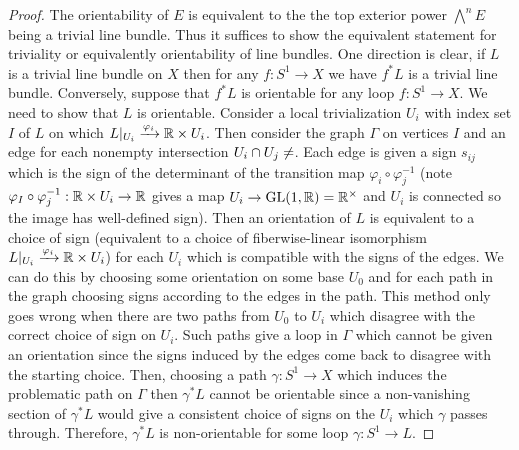 \documentclass[12pt]{extarticle}
\begin{document}
\begin{proof}
The orientability of $E$ is equivalent to the the top exterior power $\bigwedge^n E$ being a trivial line bundle. Thus it suffices to show the equivalent statement for triviality or equivalently orientability of line bundles. One direction is clear, if $L$ is a trivial line bundle on $X$ then for any $f : S^1 \to X$ we have $f^* L$ is a trivial line bundle. Conversely, suppose that $f^* L$ is orientable for any loop $f : S^1 \to X$. We need to show that $L$ is orientable. Consider a local trivialization $U_i$ with index set $I$ of $L$ on which $L |_{U_i} \xrightarrow{\varphi_i} \mathbb{R} \times U_i$. Then consider the graph $\Gamma$ on vertices $I$ and an edge for each nonempty intersection $U_i \cap U_j \neq \empty$. Each edge is given a sign $s_{ij}$ which is the sign of the determinant of the transition map $\varphi_i \circ \varphi_j^{-1}$ (note $\varphi_I \circ \varphi_j^{-1} : \mathbb{R} \times U_i \to \mathbb{R}$ gives a map $U_i \to \mathrm{GL}(1, \mathbb{R}) = \mathbb{R}^\times$ and $U_i$ is connected so the image has well-defined sign). Then an orientation of $L$ is equivalent to a choice of sign (equivalent to a choice of fiberwise-linear isomorphism $L|_{U_i} \xrightarrow{\varphi_i} \mathbb{R} \times U_i$) for each $U_i$ which is compatible with the signs of the edges. We can do this by choosing some orientation on some base $U_0$ and for each path in the graph choosing signs according to the edges in the path. This method only goes wrong when there are two paths from $U_0$ to $U_i$ which disagree with the correct choice of sign on $U_i$. Such paths give a loop in $\Gamma$ which cannot be given an orientation since the signs induced by the edges come back to disagree with the starting choice. Then, choosing a path $\gamma : S^1 \to X$ which induces the problematic path on $\Gamma$ then $\gamma^* L$ cannot be orientable since a non-vanishing section of $\gamma^* L$ would give a consistent choice of signs on the $U_i$ which $\gamma$ passes through. Therefore, $\gamma^* L$ is non-orientable for some loop $\gamma : S^1 \to L$. 
\end{proof}
\end{document}
